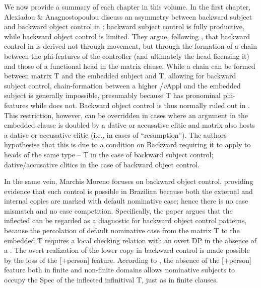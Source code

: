 \documentclass[output=paper]{langsci/langscibook}
\begin{document}
We now provide a summary of each chapter in this volume. In the first chapter, Alexiadou \& Anagnostopoulou discuss an asymmetry between backward subject and backward object control in : backward subject control is fully productive, while backward object control is limited. They argue, following \citet{Tsakali2017}, that backward control in  is derived not through movement, but through the formation of a chain between the phi-features of the controller (and ultimately the head licensing it) and those of a functional head in the matrix clause. While a chain can be formed between matrix T and the embedded subject and T, allowing for backward subject control, chain-formation between a higher /\textit{v}Appl and the embedded subject is generally impossible, presumably because T has pronominal phi-features while  does not. Backward object control is thus normally ruled out in . This restriction, however, can be overridden in cases where an  argument in the embedded clause is doubled by a dative or accusative clitic and matrix  also hosts a dative or accusative clitic (i.e., in cases of ``resumption''). The authors hypothesise that this is due to a condition on Backward  requiring it to apply to heads of the same type – T in the case of backward subject control; dative\slash accusative clitics in the case of backward object control.

In the same vein, Marchis Moreno focuses on backward object control, providing evidence that such control is possible in Brazilian  because both the external and internal copies are marked with default nominative case; hence there is no case mismatch and no case competition. Specifically, the paper argues that the inflected  can be regarded as a diagnostic for backward object control patterns, because the percolation of default nominative case from the matrix T to the embedded T requires a local checking relation with an overt DP in the absence of a . The overt realization of the lower copy in backward control is made possible by the loss of the [+person] feature. According to \citet{Cyrino2010}, the absence of the [+person] feature both in finite and non-finite domains allows nominative subjects to occupy the Spec of the inflected infinitival T, just as in finite clauses.
\end{document}
